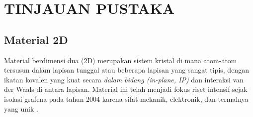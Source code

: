 \renewcommand{\thechapter}{\Roman{chapter}}
\chapter{TINJAUAN PUSTAKA}
\renewcommand{\thechapter}{\arabic{chapter}}


\section{Material 2D}
Material berdimensi dua (2D) merupakan sistem kristal di mana atom-atom tersusun dalam lapisan tunggal atau beberapa lapisan yang sangat tipis, dengan ikatan kovalen yang kuat secara \emph{dalam bidang (in-plane, IP)} dan interaksi van der Waals di antara lapisan.
Material ini telah menjadi fokus riset intensif sejak isolasi grafena pada tahun 2004 karena sifat mekanik, elektronik, dan termalnya yang unik \citep{Novoselov2004, Geim2007}.

